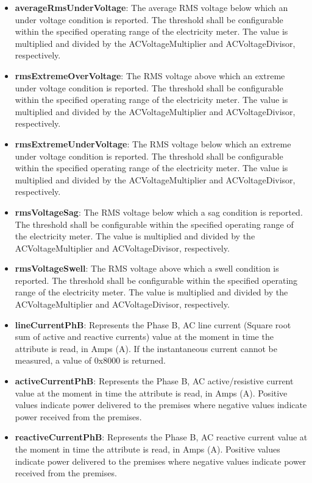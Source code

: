 \begin{itemize}
\item \textbf{averageRmsUnderVoltage}: The average RMS voltage below which an under voltage condition is reported. The threshold shall be configurable within the specified operating range of the electricity meter. The value is multiplied and divided by the ACVoltageMultiplier and ACVoltageDivisor, respectively.
\item \textbf{rmsExtremeOverVoltage}: The RMS voltage above which an extreme under voltage condition is reported. The threshold shall be configurable within the specified operating range of the electricity meter. The value is multiplied and divided by the ACVoltageMultiplier and ACVoltageDivisor, respectively.
\item \textbf{rmsExtremeUnderVoltage}: The RMS voltage below which an extreme under voltage condition is reported. The threshold shall be configurable within the specified operating range of the electricity meter. The value is multiplied and divided by the ACVoltageMultiplier and ACVoltageDivisor, respectively.
\item \textbf{rmsVoltageSag}: The RMS voltage below which a sag condition is reported. The threshold shall be configurable within the specified operating range of the electricity meter. The value is multiplied and divided by the ACVoltageMultiplier and ACVoltageDivisor, respectively.
\item \textbf{rmsVoltageSwell}: The RMS voltage above which a swell condition is reported. The threshold shall be configurable within the specified operating range of the electricity meter. The value is multiplied and divided by the ACVoltageMultiplier and ACVoltageDivisor, respectively.
\item \textbf{lineCurrentPhB}: Represents the Phase B, AC line current (Square root sum of active and reactive currents) value at the moment in time the attribute is read, in Amps (A). If the instantaneous current cannot be measured, a value of 0x8000 is returned.
\item \textbf{activeCurrentPhB}: Represents the Phase B, AC active/resistive current value at the moment in time the attribute is read, in Amps (A). Positive values indicate power delivered to the premises where negative values indicate power received from the premises.
\item \textbf{reactiveCurrentPhB}: Represents the Phase B, AC reactive current value at the moment in time the attribute is read, in Amps (A). Positive values indicate power delivered to the premises where negative values indicate power received from the premises.

\end{itemize}
